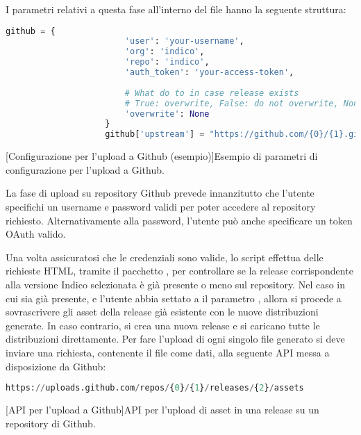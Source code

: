             I parametri relativi a questa fase all'interno del file  hanno la seguente struttura:
            
            \begin{center}
                \begin{lstlisting}[language=python, gobble=18]
                    github = {
                        'user': 'your-username',
                        'org': 'indico',
                        'repo': 'indico',
                        'auth_token': 'your-access-token',
                    
                        # What do to in case release exists
                        # True: overwrite, False: do not overwrite, None: ask
                        'overwrite': None
                    }
                    github['upstream'] = "https://github.com/{0}/{1}.git".format(github['org'], github['repo'])
                \end{lstlisting}
                \captionsetup{textformat=empty,labelformat=empty} \vspace{-2em}
                [Configurazione per l'upload a Github (esempio)]{Esempio di parametri di configurazione per l'upload a Github.}
            \end{center}
            
            La fase di upload su repository Github prevede innanzitutto che l'utente specifichi un username e password validi per poter accedere al repository richiesto. Alternativamente alla password, l'utente può anche specificare un token OAuth valido.
            
            Una volta assicuratosi che le credenziali sono valide, lo script effettua delle richieste \ac{HTML}, tramite il pacchetto , per controllare se la release corrispondente alla versione Indico selezionata è già presente o meno sul repository. Nel caso in cui sia già presente, e l'utente abbia settato a  il parametro , allora si procede a sovrascrivere gli asset della release già esistente con le nuove distribuzioni generate. In caso contrario, si crea una nuova release e si caricano tutte le distribuzioni direttamente. Per fare l'upload di ogni singolo file generato si deve inviare una richiesta, contenente il file come dati, alla seguente \ac{API} messa a disposizione da Github:
            
            \begin{center}
                \begin{lstlisting}[language=python, gobble=18]
                    https://uploads.github.com/repos/{0}/{1}/releases/{2}/assets
                \end{lstlisting}
                \captionsetup{textformat=empty,labelformat=empty} \vspace{-2em}
                [API per l'upload a Github]{API per l'upload di asset in una release su un repository di Github.}
            \end{center}
            
